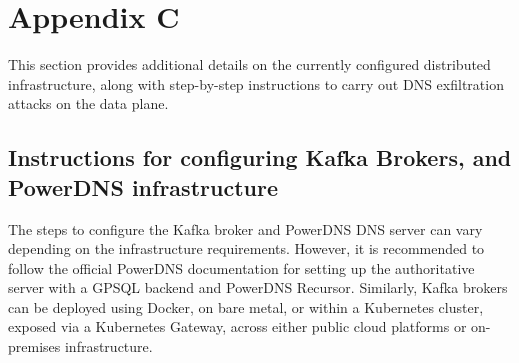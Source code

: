 \documentclass [11pt, proquest] {uwthesis}[2020/02/24]
\begin{document}
\section{Appendix C}
This section provides additional details on the currently configured distributed infrastructure, along with step-by-step instructions to carry out DNS exfiltration attacks on the data plane.

\subsection{Instructions for configuring Kafka Brokers, and PowerDNS infrastructure}
The steps to configure the Kafka broker and PowerDNS DNS server can vary depending on the infrastructure requirements. However, it is recommended to follow the official PowerDNS documentation for setting up the authoritative server with a GPSQL backend and PowerDNS Recursor. Similarly, Kafka brokers can be deployed using Docker, on bare metal, or within a Kubernetes cluster, exposed via a Kubernetes Gateway, across either public cloud platforms or on-premises infrastructure.
\end{document}
